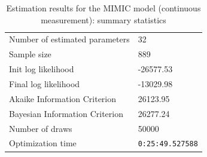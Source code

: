 \documentclass[12pt,a4paper]{article}
\begin{document}
\begin{table}[htb]
  \centering \small \ttfamily
  \begin{tabular}{ll}
    Number of estimated parameters & 32 \\
Sample size & 889 \\
Init log likelihood & -26577.53 \\
Final log likelihood & -13029.98 \\
Akaike Information Criterion & 26123.95 \\
Bayesian Information Criterion & 26277.24 \\
Number of draws & 50000 \\
Optimization time & \verb$0:25:49.527588$ \\
\end{tabular}
\caption{Estimation results for the MIMIC model (continuous
  measurement): summary statistics}
\label{tab:example2_results_summary} 
\end{table}
\end{document}

